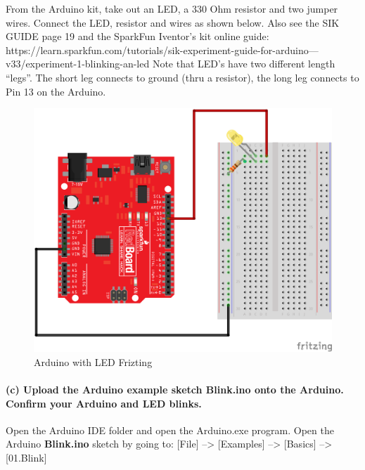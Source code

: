 \documentclass[11pt]{article}
\makeatletter
\def\maxwidth{\ifdim\Gin@nat@width>\linewidth\linewidth
    \else\Gin@nat@width\fi}
\let\Oldincludegraphics\includegraphics
\renewcommand{\includegraphics}[1]{\Oldincludegraphics[width=.8\maxwidth]{#1}}
\makeatother
\begin{document}
From the Arduino kit, take out an LED, a 330 Ohm resistor and two jumper
wires. Connect the LED, resistor and wires as shown below. Also see the
SIK GUIDE page 19 and the SparkFun Iventor's kit online guide:
https://learn.sparkfun.com/tutorials/sik-experiment-guide-for-arduino---v33/experiment-1-blinking-an-led
Note that LED's have two different length ``legs''. The short leg
connects to ground (thru a resistor), the long leg connects to Pin 13 on
the Arduino.

\begin{figure}
\centering
\includegraphics{images/Arduino_LED_fritzing.png}
\caption{Arduino with LED Frizting}
\end{figure}

    \hypertarget{c-upload-the-arduino-example-sketch-blink.ino-onto-the-arduino.-confirm-your-arduino-and-led-blinks.}{%
\paragraph{\texorpdfstring{(c) Upload the Arduino example sketch
\textbf{Blink.ino} onto the Arduino. Confirm your Arduino and LED
blinks.}{(c) Upload the Arduino example sketch Blink.ino onto the Arduino. Confirm your Arduino and LED blinks.}}\label{c-upload-the-arduino-example-sketch-blink.ino-onto-the-arduino.-confirm-your-arduino-and-led-blinks.}}

Open the Arduino IDE folder and open the Arduino.exe program. Open the
Arduino \textbf{Blink.ino} sketch by going to: {[}File{]}
--\textgreater{} {[}Examples{]} --\textgreater{} {[}Basics{]}
--\textgreater{} {[}01.Blink{]}
\end{document}
